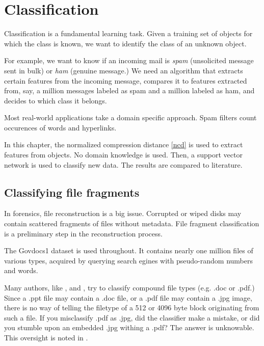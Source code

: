 
\chapter{Classification} %

\label{Chapter4} %



Classification is a fundamental learning task. Given a training
set of objects for which the class is known, we want to identify the class
of an unknown object.

For example, we want to know if an incoming mail is \emph{spam}
(unsolicited message sent in bulk) or \emph{ham} (genuine message.) We
need an algorithm that extracts certain features from the incoming
message, compares it to features extracted from, say, a million messages
labeled as spam and a million labeled as ham, and decides to which class
it belongs.

Most real-world applications take a domain specific approach. Spam filters
count occurences of words and hyperlinks.

In this chapter, the normalized compression distance \eqref{ncd} is used
to extract features from objects. No domain knowledge is used. Then,
a support vector network is used to classify new data. The results are
compared to literature.  

\section{Classifying file fragments}

In forensics, file reconstruction is a big issue. Corrupted or wiped disks
may contain scattered fragments of files without metadata. File fragment
classification is a preliminary step in the reconstruction process.

The Govdocs1 dataset \cite{Garfinkel2009} is used throughout. It contains
nearly one million files of various types, acquired by querying search
egines with pseudo-random numbers and words.

Many authors, like \cite{Li2010}, \cite{Veenman2007} and
\cite{Axelsson2010}, try to classify compound file types (e.g. .doc or
.pdf.) Since a .ppt file may contain a .doc file, or a .pdf file may
contain a .jpg image, there is no way of telling the filetype of a 512 or
4096 byte block originating from such a file. If you misclassify .pdf as
     .jpg, did the classifier make a mistake, or did you stumble upon an
     embedded .jpg withing a .pdf? The answer is unknowable. This
     oversight is noted in \cite{Roussev2013}.

